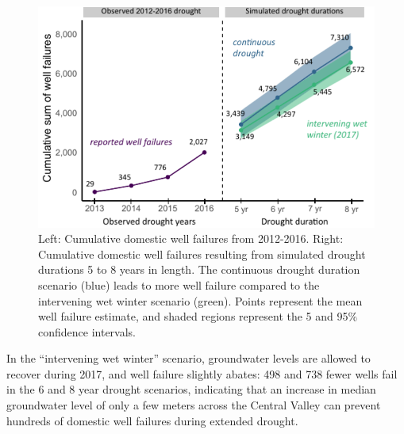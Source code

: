 \begin{figure}%
	\includegraphics[width=\textwidth]{ch2_figs/fig_cum_sum_fail.pdf}
	\caption{Left: Cumulative domestic well failures from 2012-2016. Right: Cumulative domestic well failures resulting from simulated drought durations 5 to 8 years in length. The continuous drought duration scenario (blue) leads to more well failure compared to the intervening wet winter scenario (green). Points represent the mean well failure estimate, and shaded regions represent the 5 and 95\% confidence intervals. %
	}
	\label{fig:cum_sum_failure}
\end{figure}


In the ``intervening wet winter'' scenario, groundwater levels are allowed to recover during 2017, and well failure slightly abates: 498 and 738 fewer wells fail in the 6 and 8 year drought scenarios, indicating that an increase in median groundwater level of only a few meters across the Central Valley can prevent hundreds of domestic well failures during extended drought.  


